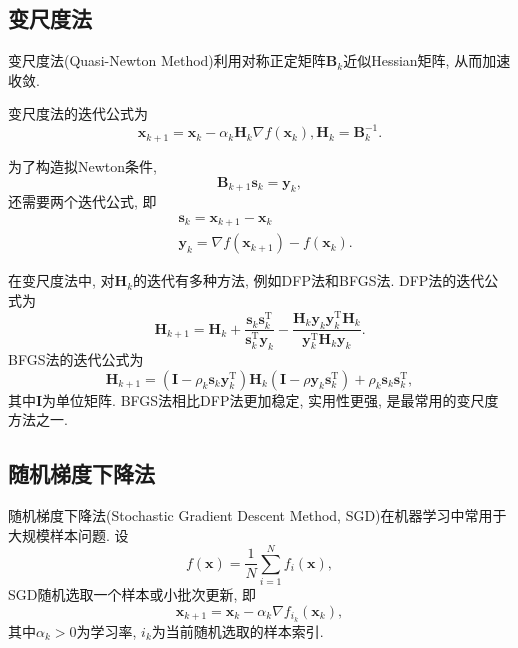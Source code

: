 \subsection{变尺度法}

变尺度法(Quasi-Newton Method)利用对称正定矩阵$\bm{B}_k$近似Hessian矩阵, 从而加速收敛.

变尺度法的迭代公式为
\begin{equation*}
    \bm{x}_{k+1}=\bm{x}_k-\alpha_k\bm{H}_k\nabla f(\bm{x}_k), \bm{H}_k=\bm{B}_k^{-1}.
\end{equation*}

为了构造拟Newton条件, 
\begin{equation*}
    \bm{B}_{k+1}\bm{s}_{k}=\bm{y}_k,
\end{equation*}
还需要两个迭代公式, 即
\begin{align*}
    &\bm{s}_k=\bm{x}_{k+1}-\bm{x}_k \\
    &\bm{y}_k=\nabla f(\bm{x}_{k+1})-f(\bm{x}_k).
\end{align*}

在变尺度法中, 对$\bm{H}_k$的迭代有多种方法, 例如DFP法和BFGS法.
DFP法的迭代公式为
\begin{equation*}
    \bm{H}_{k+1}=\bm{H}_k+\frac{\bm{s}_k\bm{s}_k^\mathrm{T}}{\bm{s}_k^\mathrm{T}\bm{y}_k}-\frac{\bm{H}_k\bm{y}_k\bm{y}_k^\mathrm{T}\bm{H}_k}{\bm{y}_k^\mathrm{T}\bm{H}_k\bm{y}_k}.
\end{equation*}
BFGS法的迭代公式为
\begin{equation*}
    \bm{H}_{k+1}=(\bm{I}-\rho_k\bm{s}_k\bm{y}_k^\mathrm{T})\bm{H}_k(\bm{I}-\rho\bm{y}_k\bm{s}_k^\mathrm{T})+\rho_k\bm{s}_k\bm{s}_k^\mathrm{T},
\end{equation*}
其中$\bm{I}$为单位矩阵.
BFGS法相比DFP法更加稳定, 实用性更强, 是最常用的变尺度方法之一.

\subsection{随机梯度下降法}

随机梯度下降法(Stochastic Gradient Descent Method, SGD)在机器学习中常用于大规模样本问题.
设
\begin{equation*}
    f(\bm{x})=\frac{1}{N}\sum_{i=1}^Nf_i(\bm{x}),
\end{equation*}
SGD随机选取一个样本或小批次更新, 即
\begin{equation*}
    \bm{x}_{k+1}=\bm{x}_k-\alpha_k\nabla f_{i_k}(\bm{x}_k),
\end{equation*}
其中$\alpha_k>0$为学习率, $i_k$为当前随机选取的样本索引.

